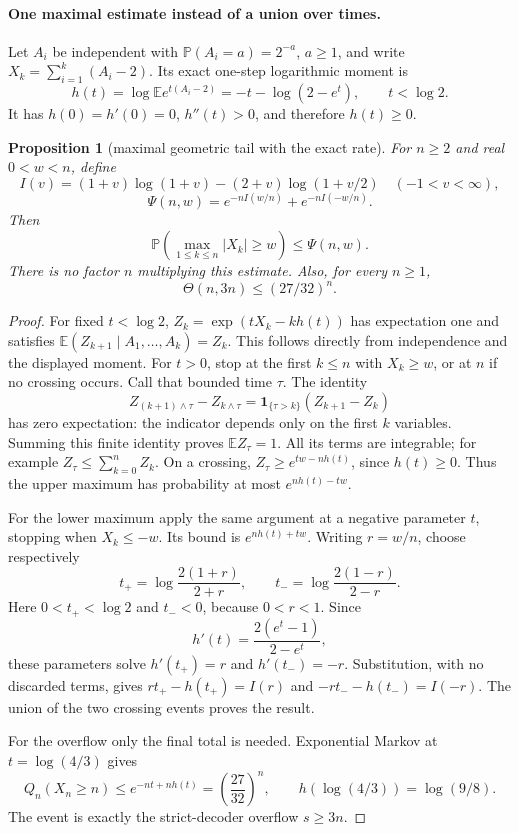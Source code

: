 \documentclass[11pt]{article}
\newtheorem{proposition}{Proposition}
\theoremstyle{remark}\newtheorem{remark}[proposition]{Remark}
\begin{document}
\paragraph{One maximal estimate instead of a union over times.}
Let $A_i$ be independent with $\mathbb P(A_i=a)=2^{-a}$,
$a\ge1$, and write $X_k=\sum_{i=1}^k(A_i-2)$.
Its exact one-step logarithmic moment is
\[
 h(t)=\log\mathbb E e^{t(A_i-2)}
     =-t-\log(2-e^t),\qquad t<\log2.
\]
It has $h(0)=h'(0)=0$, $h''(t)>0$, and therefore $h(t)\ge0$.

\begin{proposition}[maximal geometric tail with the exact rate]
\label{prop:mazur-maximal-tail}
For $n\ge2$ and real $0<w<n$, define
\[
 I(v)=(1+v)\log(1+v)-(2+v)\log(1+v/2)
       \quad(-1<v<\infty),
\]
\begin{equation}
 \Psi(n,w)=e^{-nI(w/n)}+e^{-nI(-w/n)}.
 \label{eq:mazur-maximal-rate}
\end{equation}
Then
\begin{equation}
 \mathbb P\!\left(\max_{1\le k\le n}|X_k|\ge w\right)
       \le\Psi(n,w).
 \label{eq:mazur-maximal-tail}
\end{equation}
There is no factor $n$ multiplying this estimate.
Also, for every $n\ge1$,
\begin{equation}
 \Theta(n,3n)\le(27/32)^n.
 \label{eq:mazur-overflow-rate}
\end{equation}
\end{proposition}
\begin{proof}
For fixed $t<\log2$, $Z_k=\exp(tX_k-kh(t))$ has expectation
one and satisfies
$\mathbb E(Z_{k+1}\mid A_1,\ldots,A_k)=Z_k$.
This follows directly from independence and the displayed moment.
For $t>0$, stop at the first $k\le n$ with $X_k\ge w$, or at
$n$ if no crossing occurs. Call that bounded time $\tau$.
The identity
\[
 Z_{(k+1)\wedge\tau}-Z_{k\wedge\tau}
   =\mathbf1_{\{\tau>k\}}(Z_{k+1}-Z_k)
\]
has zero expectation: the indicator depends only on the first $k$
variables. Summing this finite identity proves $\mathbb E Z_\tau=1$.
All its terms are integrable; for example
$Z_\tau\le\sum_{k=0}^n Z_k$.
On a crossing, $Z_\tau\ge e^{tw-nh(t)}$, since $h(t)\ge0$.
Thus the upper maximum has probability at most $e^{nh(t)-tw}$.

For the lower maximum apply the same argument at a negative
parameter $t$, stopping when $X_k\le-w$. Its bound is
$e^{nh(t)+tw}$. Writing $r=w/n$, choose respectively
\[
 t_+=\log\frac{2(1+r)}{2+r},\qquad
 t_-=\log\frac{2(1-r)}{2-r}.
\]
Here $0<t_+<\log2$ and $t_-<0$, because $0<r<1$.
Since
\[
 h'(t)=\frac{2(e^t-1)}{2-e^t},
\]
these parameters solve $h'(t_+)=r$ and $h'(t_-)=-r$.
Substitution, with no discarded terms, gives
$rt_+-h(t_+)=I(r)$ and $-rt_--h(t_-)=I(-r)$.
The union of the two crossing events proves the result.

For the overflow only the final total is needed.
Exponential Markov at $t=\log(4/3)$ gives
\[
 Q_n(X_n\ge n)\le e^{-nt+nh(t)}
  =\left(\frac{27}{32}\right)^n,
 \qquad h(\log(4/3))=\log(9/8).
\]
The event is exactly the strict-decoder overflow $s\ge3n$.
\end{proof}
\end{document}
